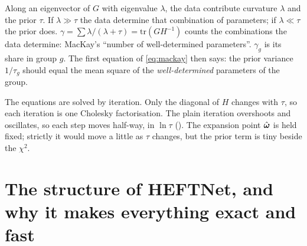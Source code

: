 \begin{keyidea}
Along an eigenvector of $G$ with eigenvalue $\lambda$, the data contribute curvature
$\lambda$ and the prior $\tau$. If $\lambda \gg \tau$ the data determine that combination
of parameters; if $\lambda \ll \tau$ the prior does. $\gamma = \sum \lambda/(\lambda +
\tau) = \mathrm{tr}(GH^{-1})$ counts the combinations the data determine: MacKay's ``number
of well-determined parameters''. $\gamma_g$ is its share in group $g$. The first equation
of \cref{eq:mackay} then says: the prior variance $1/\tau_g$ should equal the mean square
of the \emph{well-determined} parameters of the group.
\end{keyidea}

The equations are solved by iteration. Only the diagonal of $H$ changes with $\tau$, so
each iteration is one Cholesky factorisation. The plain iteration overshoots and
oscillates, so each step moves half-way, in $\ln\tau$ (). The
expansion point $\hat{\boldsymbol{\omega}}$ is held fixed; strictly it would move a little as $\tau$ changes,
but the prior term is tiny beside the $\chi^2$.

\section{The structure of HEFTNet, and why it makes everything exact and fast}
\label{sec:structure}


